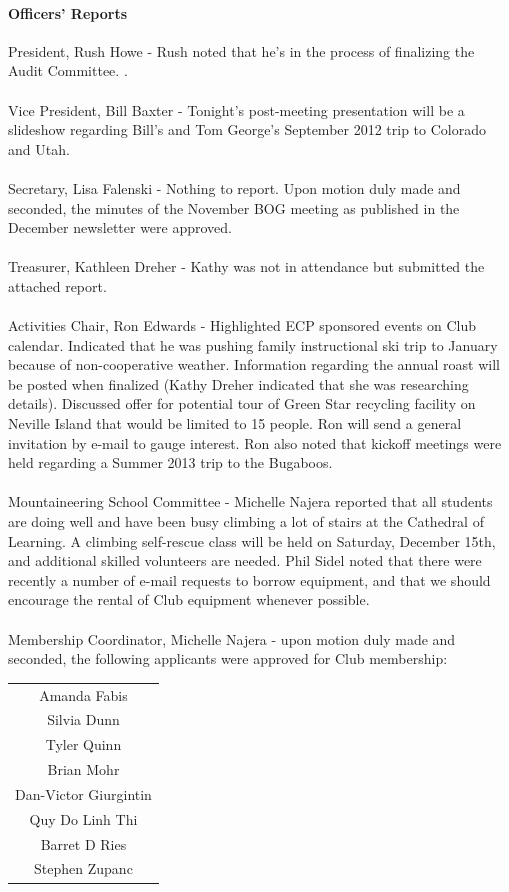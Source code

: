 \documentclass[10pt,a4paper]{article}
\begin{document}
\begin{multicols}{2}
\paragraph{Officers' Reports}

President, Rush Howe - Rush noted that he's in the process of finalizing the Audit Committee.   .
\\
\\
Vice President, Bill Baxter -  Tonight's post-meeting presentation will be a slideshow regarding Bill's and Tom George's September 2012 trip to Colorado and Utah.
\\
\\
Secretary, Lisa Falenski - Nothing to report.  Upon motion duly made and seconded, the minutes of the November BOG meeting as published in the December newsletter were approved.
\\
\\
Treasurer, Kathleen Dreher - Kathy was not in attendance but submitted the attached report.
\\
\\
Activities Chair, Ron Edwards - Highlighted ECP sponsored events on Club calendar. Indicated that he was pushing family instructional ski trip to January because of non-cooperative weather.  Information regarding the annual roast will be posted when finalized (Kathy Dreher indicated that she was researching details). Discussed offer for potential tour of Green Star recycling facility on Neville Island that would be limited to 15 people.  Ron will send a general invitation by e-mail to gauge interest. Ron also noted that kickoff meetings were held regarding a Summer 2013 trip to the Bugaboos.
\\
\\
Mountaineering School Committee - Michelle Najera reported that all students are doing well and have been busy climbing a lot of stairs at the Cathedral of Learning. A climbing self-rescue class will be held on Saturday, December 15th, and additional skilled volunteers are needed. Phil Sidel noted that there were recently a number of e-mail requests to borrow equipment, and that we should encourage the rental of Club equipment whenever possible.
\\
\\
Membership Coordinator, Michelle Najera - upon motion duly made and seconded, the following applicants were approved for Club membership:

\begin{center}
	\begin{tabular}{c}
		Amanda Fabis \\
		Silvia Dunn \\
		Tyler Quinn \\
		Brian Mohr \\
		Dan-Victor Giurgintin \\
		Quy Do Linh Thi \\
		Barret D Ries \\
		Stephen Zupanc \\
	\end{tabular}
\end{center}


\end{multicols}
\end{document}
